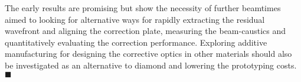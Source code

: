\begin{refsection}
The early results are promising but show the necessity of further beamtimes aimed to looking for alternative ways for rapidly extracting the residual wavefront and aligning the correction plate, measuring the beam-caustics and quantitatively evaluating the correction performance. Exploring additive manufacturing for designing the corrective optics in other materials should also be investigated as an alternative to diamond and lowering the prototyping costs. $\blacksquare$

\printbibliography[heading=subbibliography]
\end{refsection}

